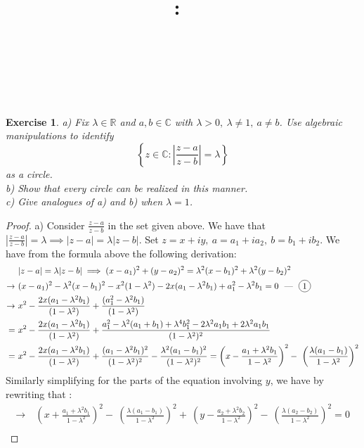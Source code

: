 \documentclass{article}
\title{
    \vspace{2in}
    \textmd{\textbf{\hmwkClass:\ \hmwkTitle}}\\
    \vspace{0.1in}
    \textmd{\hmwkDueDate} \\
    \vspace{0.2in}\large{\textit{\hmwkClassInstructor\  }}
    \vspace{2in}
}
\author{\hmwkAuthorName}
\date{}
\newcommand*\circled[1]{\tikz[baseline=(char.base)]{
            \node[shape=circle,draw,inner sep=2pt] (char) {#1};}}
\newcommand{\bb}[1]{\mathbb{#1}}
\newtheorem{exercise}{Exercise}
\begin{document}
\maketitle
\newpage
\begin{exercise}
  a) Fix $\lambda \in \bb{R}$ and $a,b \in \bb{C}$ with $\lambda > 0, \ \lambda \neq 1, \ a \neq b$. Use algebraic manipulations to identify \[ \left\{ z \in \bb{C} : \left| \frac{z-a}{z-b} \right| = \lambda\right\} \] as a circle.\\
  b) Show that every circle can be realized in this manner. \\
  c) Give analogues of a) and b) when $\lambda = 1$.
\end{exercise}
\begin{proof}
 a) Consider $\frac{z-a}{z-b}$ in the set given above. We have that $|\frac{z-a}{z-b}| = \lambda \implies |z-a| = \lambda |z-b|$. Set $z = x + iy, \ a = a_{1} + ia_{2}, \ b = b_{1} + ib_{2}$. We have from the formula above the following derivation:
  \begin{align*}
    & |z-a| = \lambda |z-b | \implies (x-a_{1})^{2} + (y-a_{2})^{2} = \lambda^{2}(x-b_{1})^{2} + \lambda^{2}(y-b_{2})^{2} \\
    \rightarrow \ & (x-a_{1})^{2} - \lambda^{2}(x-b_{1})^{2} - x^{2}(1-\lambda^{2}) - 2x(a_{1} - \lambda^{2}b_{1}) + a_{1}^{2} - \lambda^{2}b_{1} = 0 \text{ \ --- \ } \circled{1} \\
    \rightarrow \ &  x^{2} - \frac{2x(a_{1} - \lambda^{2}b_{1})}{(1-\lambda^{2})} +  \frac{(a_{1}^{2} - \lambda^{2}b_{1})}{(1-\lambda^{2})} \\
    = \ & x^{2} - \frac{2x(a_{1} - \lambda^{2}b_{1})}{(1-\lambda^{2})} +  \frac{a_{1}^{2} - \lambda^{2}(a_{1} + b_{1}) +\lambda^{4}b_{1}^{2} - 2\lambda^{2}a_{1}b_{1} + 2\lambda^{2}a_{1}b_{1}}{(1-\lambda^{2})^{2}} \\
    = \ & x^{2} - \frac{2x(a_{1} - \lambda^{2}b_{1})}{(1-\lambda^{2})} +  \frac{(a_{1}-\lambda^{2}b_{1})^{2}}{(1-\lambda^{2})^{2}} - \frac{\lambda^{2}(a_{1} - b_{1})^{2}}{(1-\lambda^{2})^{2}} = \left(x - \frac{a_{1} + \lambda^{2}b_{1}}{1-\lambda^{2}}\right) ^{2} - \ \left(\frac{\lambda(a_{1} - b_{1})}{1-\lambda^{2}}\right)^{2}
\end{align*}
Similarly simplifying for the parts of the equation involving $y$, we have by rewriting \circled{1} that :
\begin{align*}
  \rightarrow \ &\left(x + \frac{a_{1} + \lambda^{2}b_{1}}{1-\lambda^{2}}\right) ^{2} - \ \left(\frac{\lambda(a_{1} - b_{1})}{1-\lambda^{2}}\right)^{2} + \ \left(y - \frac{a_{2} + \lambda^{2}b_{2}}{1-\lambda^{2}}\right) ^{2} - \  \left(\frac{\lambda(a_{2} - b_{2})}{1-\lambda^{2}}\right)^{2} = 0 \\

\end{align*}
\end{proof}
\end{document}
